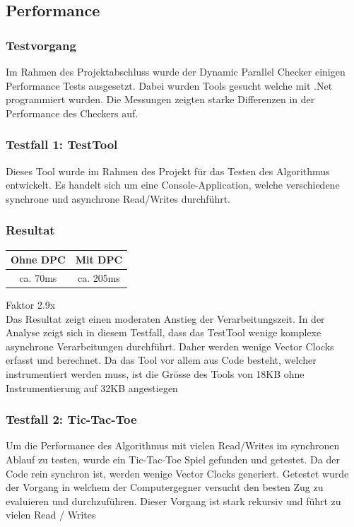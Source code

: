 \documentclass[10pt,a4paper]{article}
\begin{document}
\subsection{Performance}
\subsubsection{Testvorgang}
Im Rahmen des Projektabschluss wurde der Dynamic Parallel Checker einigen Performance Tests ausgesetzt. Dabei wurden Tools gesucht welche mit .Net programmiert wurden. Die Messungen zeigten starke Differenzen in der Performance des Checkers auf.
\subsubsection*{Testfall 1: TestTool}
Dieses Tool wurde im Rahmen des Projekt für das Testen des Algorithmus entwickelt. Es handelt sich um eine Console-Application, welche verschiedene synchrone und asynchrone Read/Writes durchführt.\\
\subsubsection*{Resultat}
\begin{tabular}{|c|c|}
\hline 
Ohne DPC & Mit DPC \\ 
\hline 
ca. 70ms & ca. 205ms \\ 
\hline 
\end{tabular} 
Faktor 2.9x\\[0.4cm]
Das Resultat zeigt einen moderaten Anstieg der Verarbeitungszeit. In der Analyse zeigt sich in diesem Testfall, dass das TestTool wenige komplexe asynchrone Verarbeitungen durchführt. Daher werden wenige Vector Clocks erfasst und berechnet. Da das Tool vor allem aus Code besteht, welcher instrumentiert werden muss, ist die Grösse des Tools von 18KB ohne Instrumentierung auf 32KB angestiegen
\subsubsection*{Testfall 2: Tic-Tac-Toe}
Um die Performance des Algorithmus mit vielen Read/Writes im synchronen Ablauf zu testen, wurde ein Tic-Tac-Toe Spiel gefunden und getestet. Da der Code rein synchron ist, werden wenige Vector Clocks generiert. Getestet wurde der Vorgang in welchem der Computergegner versucht den besten Zug zu evaluieren und durchzuführen. Dieser Vorgang ist stark rekursiv und führt zu vielen Read / Writes\\
\end{document}
